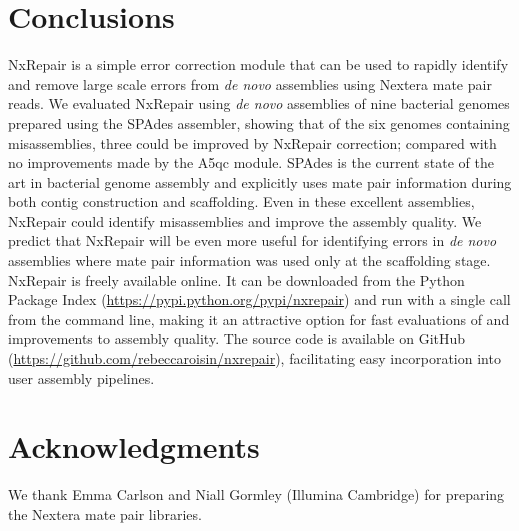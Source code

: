 \documentclass[fleqn,10pt]{wlpeerj}
\begin{document}
\section*{Conclusions}
NxRepair is a simple error correction module that can be used to rapidly identify and remove large scale errors from \textit{de novo} assemblies using Nextera mate pair reads. We evaluated NxRepair using \textit{de novo} assemblies of nine bacterial genomes prepared using the SPAdes assembler, showing that of the six genomes containing misassemblies, three could be improved by NxRepair correction; compared with no improvements made by the A5qc module. SPAdes is the current state of the art in bacterial genome assembly and explicitly uses mate pair information during both contig construction and scaffolding. Even in these excellent assemblies, NxRepair could identify misassemblies and improve the assembly quality. We predict that NxRepair will be even more useful for identifying errors in \textit{de novo} assemblies where mate pair information was used only at the scaffolding stage. NxRepair is freely available online. It can be downloaded from the Python Package Index (\url{https://pypi.python.org/pypi/nxrepair}) and run with a single call from the command line, making it an attractive option for fast evaluations of and improvements to assembly quality. The source code is available on GitHub (\url{https://github.com/rebeccaroisin/nxrepair}), facilitating easy incorporation into user assembly pipelines.  

\section*{Acknowledgments}
We thank Emma Carlson and Niall Gormley (Illumina Cambridge) for preparing the Nextera mate pair libraries.




%
\end{document}
